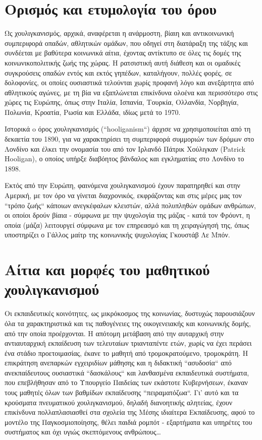 \documentclass[12pt,a4paper,oneside]{book}
\begin{document}
\section*{Ορισμός και ετυμολογία του όρου}
\indent Ως  χουλιγκανισμός, αρχικά, αναφέρεται η ανάρμοστη,
βίαιη και αντικοινωνική συμπεριφορά οπαδών, αθλητικών ομάδων, που οδηγεί στη διατάραξη της τάξης και συνδέεται με βαθύτερα κοινωνικά
αίτια, έχοντας αντίκτυπο σε όλες τις δομές της κοινωνικοπολιτικής ζωής της
χώρας. Η ρατσιστική αυτή διάθεση και οι ομαδικές συγκρούσεις οπαδών εντός και 
εκτός γηπέδων, καταλήγουν, πολλές φορές, σε δολοφονίες, οι οποίες ουσιαστικά
τελούνται χωρίς προφανή λόγο και ανεξάρτητα από αθλητικούς αγώνες, με τη βία να εξαπλώνεται επικίνδυνα ολοένα και περισσότερο στις χώρες τις Ευρώπης, όπως στην Ιταλία, Ισπανία, Τουρκία, Ολλανδία, Νορβηγία, Πολωνία, Κροατία, Ρωσία και Ελλάδα, ιδίως μετά το 1970.

\indent Ιστορικά o όρος χουλιγκανισμός
(``hooliganism``) άρχισε να χρησιμοποιείται από τη δεκαετία του \num{1890}, για να χαρακτηρίσει τη συμπεριφορά συμμοριών των δρόμων στο Λονδίνο και έλκει την ονομασία του από τον Ιρλανδό Πάτρικ Χούλιγκαν (Patrick Hooligan), ο οποίος υπήρξε διαβόητος βάνδαλος και εγκληματίας στο Λονδίνο το \num{1898}.

\indent Εκτός από την Ευρώπη, φαινόμενα χουλιγκανισμού έχουν παρατηρηθεί και
στην Αμερική, με τον όρο  να γίνεται διαχρονικός, εκφράζοντας και στις μέρες μας τον ``τρόπο ζωής`` κάποιων ανεγκέφαλων κλειστών, αλλά πολυπληθών ομάδων ανθρώπων, οι οποίοι δρούν βίαια - σύμφωνα με την ψυχολογία της μάζας - κατά τον Φρόυντ, η οποία (μάζα) λειτουργεί σύμφωνα με τον επηρεασμό και τη χειραγώγησή της, όπως υποστηρίζει ο Γάλλος μαίτρ της κοινωνικής ψυχολογίας Γκουστάβ Λε Μπόν.

\section*{Αίτια και μορφές του μαθητικού χουλιγκανισμού}
\indent Οι εκπαιδευτικές κοινότητες, ως μικρόκοσμος της κοινωνίας, δυστυχώς
παρουσιάζουν όλα τα χαρακτηριστικά και τις παθογένειες της οικογενειακής και κοινωνικής δομής, από την οποία προέρχονται. Η απότομη μετάβαση από την αυταρχική στην
αντιαυταρχική εκπαίδευση των τελευταίων τριανταπέντε ετών, χωρίς να έχει περάσει
ένα στάδιο προετοιμασίας, έκανε το μαθητή από  τρομοκρατούμενο, τρομοκράτη. Η
επικράτηση ανεπαρκών εγχειριδίων μάθησης και η διδακτική ``ασυδοσία`` από
ανεκπαίδευτους ουσιαστικά ``δασκάλους`` και λανθασμένα εκπαιδευτικά συστήματα,
που επεβλήθησαν από το Υπουργείο Παιδείας των εκάστοτε Κυβερνήσεων, έκαναν τους
μαθητές όλων των βαθμίδων εκπαίδευσης ``πειραματόζωα``. Γι' αυτό και τα
κρούσματα πνευματικού χουλιγκανισμού, δηλαδή διανοητικής αλητείας, έχουν
επικίνδυνα πολλαπλασιασθεί στα σχολεία της Μέσης ιδιαίτερα Εκπαίδευσης, αφού το
μοντέλο της Παγκοσμιοποίησης, θέλει παιδιά ρομπότ - εξαρτήματα και υπηρέτες του
συστήματος και όχι υγιώς σκεπτόμενους ανθρώπους\ldots
\end{document}
